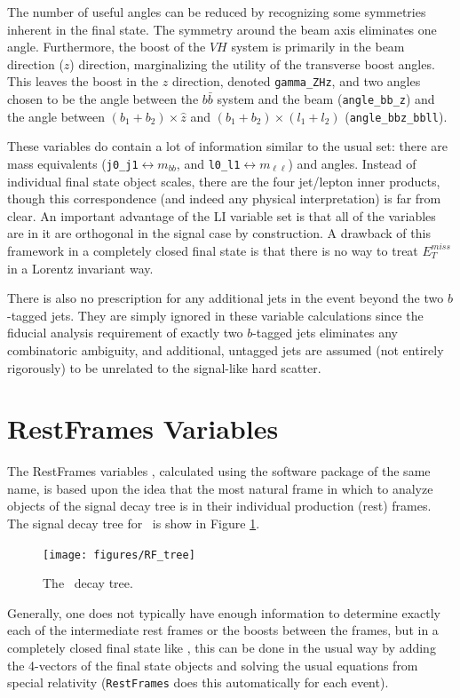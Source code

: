   The number of useful angles can be reduced by recognizing some symmetries inherent in the final state.  The symmetry around the beam axis eliminates one angle.  Furthermore, the boost of the $VH$ system is primarily in the beam direction ($z$) direction, marginalizing the utility of the transverse boost angles.  This leaves the boost in the $z$ direction, denoted \texttt{gamma\_ZHz}, and two angles chosen to be the angle between the $b\bar{b}$ system and the beam (\texttt{angle\_bb\_z}) and the angle between $\left(b_1+b_2\right)\times\hat{z}$ and $\left(b_1+b_2\right)\times\left(l_1+l_2\right)$ (\texttt{angle\_bbz\_bbll}).

These variables do contain a lot of information similar to the usual set: there are mass equivalents (\texttt{j0\_j1}$\leftrightarrow m_{bb}$, and \texttt{l0\_l1}$\leftrightarrow m_{\ell\ell}$) and angles.  Instead of individual final state object scales, there are the four jet/lepton inner products, though this correspondence (and indeed any physical interpretation) is far from clear.  An important advantage of the LI variable set is that all of the variables are in it are orthogonal in the signal case by construction.  A drawback of this framework in a completely closed final state is that there is no way to treat $E_T^{miss}$ in a Lorentz invariant way.  %

  There is also no prescription for any additional jets in the event beyond the two $b$-tagged jets.  They are simply ignored in these variable calculations since the fiducial analysis requirement of exactly two $b$-tagged jets eliminates any combinatoric ambiguity, and additional, untagged jets are assumed (not entirely rigorously) to be unrelated to the signal-like hard scatter.

\section{RestFrames Variables}
\label{sec:rf}
The RestFrames variables \cite{rjr}, calculated using the software package of the same name, is based upon the idea that the most natural frame in which to analyze objects of the signal decay tree is in their individual production (rest) frames.  The signal decay tree for \ZH\, is show in Figure \ref{fig:rftree}.
\begin{figure}[!htbp]\captionsetup{justification=centering}
  \centering
  \texttt{[image: figures/RF\_tree]}
  \caption{The \ZH\, decay tree.}
  \label{fig:rftree}
\end{figure}
Generally, one does not typically have enough information to determine exactly each of the intermediate rest frames or the boosts between the frames, but in a completely closed final state like \ZH, this can be done in the usual way by adding the 4-vectors of the final state objects and solving the usual equations from special relativity (\texttt{RestFrames} does this automatically for each event).

